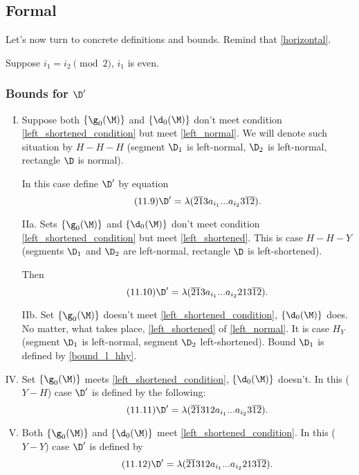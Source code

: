 \subsection{Formal}

Let's now turn to concrete definitions and bounds. Remind that \ref{horizontal}.

Suppose $i_1 = i_2 \pmod 2$, $i_1$ is even.

\subsubsection{Bounds for $\D'$}

\begin{enumerate}[I.]
	\item Suppose both $\{\g_0(\M)\}$ and $\{\d_0(\M)\}$
	don't meet condition \ref{left_shortened_condition} but meet \ref{left_normal}.
	We will denote such situation by $H-H-H$
	(segment $\D_1$ is left-normal, $\D_2$ is left-normal, rectangle $\D$ is normal).
	
	In this case define $\D'$ by equation
	\begin{equation}\tag{11.9}
		\D' = \lambda(\overline{21}3a_{i_1}... a_{i_2}3\overline{12}).
	\end{equation}
	
	\item[IIa.] Sets $\{\g_0(\M)\}$ and $\{\d_0(\M)\}$
	don't meet condition \ref{left_shortened_condition} but meet \ref{left_shortened}.
	This is case $H-H-Y$
	(segments $\D_1$ and $\D_2$ are left-normal, rectangle $\D$ is left-shortened).
	
	Then
	\begin{equation}\tag{11.10}\label{bound_l_hhy}
		\D' = \lambda(\overline{21}3a_{i_1}... a_{i_2}213\overline{12}).
	\end{equation}
	
	\item[IIb.] Set $\{\g_0(\M)\}$ doesn't meet \ref{left_shortened_condition},
	$\{\d_0(\M)\}$ does.
	No matter, what takes place, \ref{left_shortened} of \ref{left_normal}.
	It is case $H_Y$
	(segment $\D_1$ is left-normal, segment $\D_2$ left-shortened).
	Bound $\D_1$ is defined by \ref{bound_l_hhy}.
	
	\addtocounter{enumi}{1}
	\item Set $\{\g_0(\M)\}$ meets \ref{left_shortened_condition},
	$\{\d_0(\M)\}$ doesn't.
	In this ($Y-H$) case $\D'$ is defined by the following:
	\begin{equation}\tag{11.11}\label{bound_l_yh}
		\D' = \lambda(\overline{21}312a_{i_1}... a_{i_2}3\overline{12}).
	\end{equation}
	
	\item Both $\{\g_0(\M)\}$ and $\{\d_0(\M)\}$
	meet \ref{left_shortened_condition}.
	In this ($Y-Y$) case $\D'$ is defined by
	\begin{equation}\tag{11.12}
		\D' = \lambda(\overline{21}312a_{i_1}... a_{i_2}213\overline{12}).
	\end{equation}
\end{enumerate}

